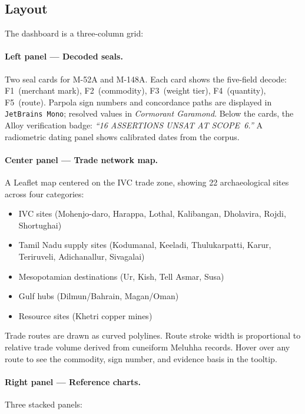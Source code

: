 \subsection{Layout}

The dashboard is a three-column grid:

\paragraph{Left panel --- Decoded seals.}
Two seal cards for M-52A and M-148A. Each card shows the five-field
decode: F1~(merchant mark), F2~(commodity), F3~(weight tier),
F4~(quantity), F5~(route). Parpola sign numbers and concordance
paths are displayed in \texttt{JetBrains Mono}; resolved values in
\textit{Cormorant Garamond}. Below the cards, the Alloy
verification badge: \textit{``16 ASSERTIONS UNSAT AT SCOPE~6.''}
A radiometric dating panel shows calibrated dates from the corpus.

\paragraph{Center panel --- Trade network map.}
A Leaflet map centered on the IVC trade zone, showing 22
archaeological sites across four categories:

\begin{itemize}
\item IVC sites (Mohenjo-daro, Harappa, Lothal, Kalibangan,
  Dholavira, Rojdi, Shortughai)
\item Tamil Nadu supply sites (Kodumanal, Keeladi, Thulukarpatti,
  Karur, Teriruveli, Adichanallur, Sivagalai)
\item Mesopotamian destinations (Ur, Kish, Tell Asmar, Susa)
\item Gulf hubs (Dilmun/Bahrain, Magan/Oman)
\item Resource sites (Khetri copper mines)
\end{itemize}

Trade routes are drawn as curved polylines. Route stroke width
is proportional to relative trade volume derived from cuneiform
Meluhha records. Hover over any route to see the commodity,
sign number, and evidence basis in the tooltip.

\paragraph{Right panel --- Reference charts.}
Three stacked panels:

